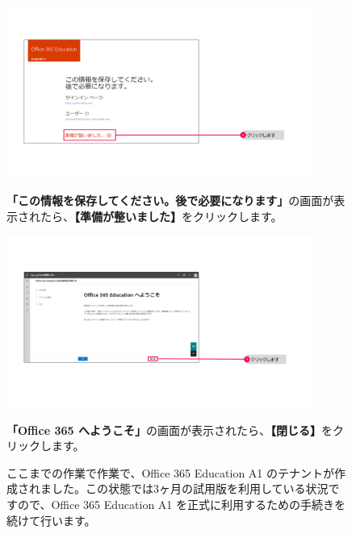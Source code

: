\begin{figure}[h]
    \begin{minipage}{0.6\textwidth}
        \includegraphics[width=10cm]{figures/O365A1_submission06.png}
    \end{minipage}
    \begin{minipage}{0.4\textwidth}
       \textbf{「この情報を保存してください。後で必要になります」}の画面が表示されたら、\textbf{【準備が整いました】}をクリックします。
    \end{minipage}
\end{figure}

\begin{figure}[h]
    \begin{minipage}{0.6\textwidth}
        \includegraphics[width=10cm]{figures/O365A1_submission07.png}
    \end{minipage}
    \begin{minipage}{0.4\textwidth}
       \textbf{「Office 365 へようこそ」}の画面が表示されたら、\textbf{【閉じる】}をクリックします。
    \end{minipage}
\end{figure}

\begin{figure}[h]
    \begin{minipage}{1.0\textwidth}
        ここまでの作業で作業で、Office 365 Education A1 のテナントが作成されました。この状態では3ヶ月の試用版を利用している状況ですので、Office 365 Education A1 を正式に利用するための手続きを続けて行います。
    \end{minipage}
    \vspace{3cm}
\end{figure}



